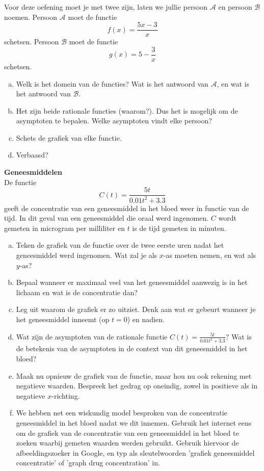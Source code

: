 \documentclass[12pt]{article}
\begin{document}
\begin{oefening}
Voor deze oefening moet je met twee zijn, laten we jullie persoon $\mathcal{A}$ en persoon $\mathcal{B}$ noemen. Persoon $\mathcal{A}$ moet de functie $$f(x)=\frac{5x-3}{x}$$ schetsen. Persoon $\mathcal{B}$ moet de functie $$g(x)=5-\frac{3}{x}$$ schetsen.

\begin{enumerate}[(a)]
  \item Welk is het domein van de functies? Wat is het antwoord van $\mathcal{A}$, en wat is het antwoord van $\mathcal{B}$.
  \item Het zijn beide rationale functies (waarom?). Dus het is mogelijk om de asymptoten te bepalen. Welke asymptoten vindt elke persoon?
  \item Schets de grafiek van elke functie.
  \item Verbaasd?
\end{enumerate}
\end{oefening}


\begin{oefening} {\bf Geneesmiddelen}\\
De functie
$$C(t)=\frac{5t}{0.01t^2+3.3}$$
geeft de concentratie van een geneesmiddel in het bloed weer in functie van de tijd. In dit geval van een geneesmiddel die oraal werd ingenomen. $C$ wordt gemeten in microgram per milliliter en $t$ is de tijd gemeten in minuten.

\begin{enumerate}[(a)]
  \item Teken de grafiek van de functie over de twee eerste uren nadat het geneesmiddel werd ingenomen. Wat zal je als $x$-as moeten nemen, en wat als $y$-as?
  \item Bepaal wanneer er maximaal veel van het geneesmiddel aanwezig is in het lichaam en wat is de concentratie dan?
  \item Leg uit waarom de grafiek er zo uitziet. Denk aan wat er gebeurt wanneer je het geneesmiddel inneemt (op $t=0$) en nadien.
  \item Wat zijn de asymptoten van de rationale functie $C(t)=\frac{5t}{0.01t^2+3.3}$? Wat is de betekenis van de asymptoten in de context van dit geneesmiddel in het bloed?
  \item Maak nu opnieuw de grafiek van de functie, maar hou nu ook rekening met negatieve waarden. Bespreek het gedrag op oneindig, zowel in positieve als in negatieve $x$-richting.
  \item We hebben net een wiskundig model besproken van de concentratie geneesmiddel in het bloed nadat we dit innemen. Gebruik het internet eens om de grafiek van de concentratie van een geneesmiddel in het bloed te zoeken waarbij gemeten waarden werden gebruikt. Gebruik hiervoor de afbeeldingszoeker in Google, en typ als sleutelwoorden 'grafiek geneesmiddel concentratie' of 'graph drug concentration' in.
\end{enumerate}
\end{oefening}
\end{document}
